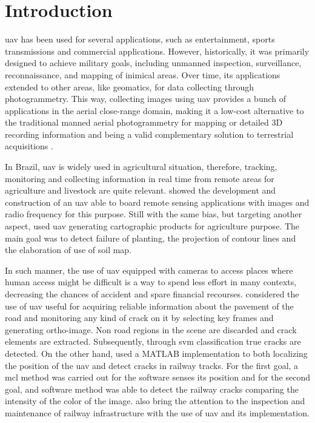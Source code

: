 \chapter[Introduction]{Introduction}\label{cha:intro}

\gls*{uav} has been used for several applications, such as entertainment, sports transmissions and commercial applications.
However, historically, it was primarily designed to achieve military goals, including unmanned inspection, surveillance, reconnaissance, and mapping of inimical areas.
Over time, its applications extended to other areas, like geomatics, for data collecting through photogrammetry. 
This way, collecting images using \gls*{uav} provides a bunch of applications in the aerial close-range domain, making it a low-cost alternative to the traditional manned aerial photogrammetry for mapping or detailed 3D recording information and being a valid complementary solution to terrestrial acquisitions \citep{nex2014uav}.

In Brazil, \gls*{uav} is widely used in agricultural situation, therefore, tracking, monitoring and collecting information in real time from remote areas for agriculture and livestock are quite relevant. 
\citet{abade2016construccao} showed the development and construction of an \gls*{uav} able to board remote sensing applications with images and radio frequency for this purpose. 
Still with the same bias, but targeting another aspect, \citet{otake2017produtos} used \gls*{uav} generating cartographic products for agriculture purpose. 
The main goal was to detect failure of planting, the projection of contour lines and the elaboration of use of soil map.

In such manner, the use of \gls*{uav} equipped with cameras to access places where human access might be difficult is a way to spend less effort in many contexts, decreasing the chances of accident and spare financial recourses.
\citet{dadrasjavan2019automatic} considered the use of \gls*{uav} useful for acquiring reliable information about the pavement of the road and monitoring any kind of crack on it by selecting key frames and generating ortho-image.
Non road regions in the scene are discarded and crack elements are extracted.
Subsequently, through \gls*{svm} classification true cracks are detected. 
On the other hand, \citet{sushant2017localization} used a MATLAB\textsuperscript{\textregistered} implementation to both localizing the position of the \gls*{uav} and detect cracks in railway tracks. For the first goal, a \gls*{mcl} method was carried out for the software senses its position and for the second goal, and software method was able to detect the railway cracks comparing the intensity of the color of the image. \citet{lesiak2020inspection} also bring the attention to the inspection and
maintenance of railway infrastructure with the use of \gls*{uav} and its implementation.





